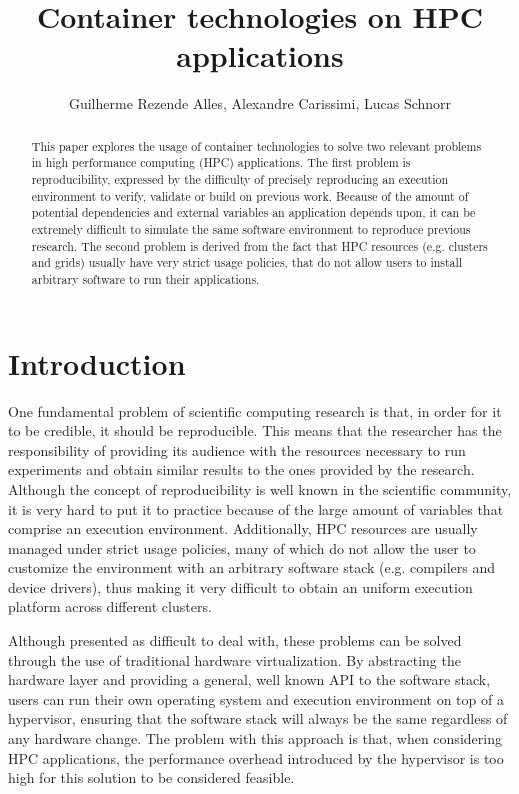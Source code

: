 \documentclass[12pt]{article}
\title{Container technologies on HPC applications}
\author{Guilherme Rezende Alles\inst{1}, Alexandre Carissimi\inst{1}, Lucas Schnorr\inst{1}}
\begin{document}
 

\maketitle

\begin{abstract}
  This paper explores the usage of container technologies to solve two relevant problems in high performance computing (HPC) applications. The first problem is reproducibility, expressed by the difficulty of precisely reproducing an execution environment to verify, validate or build on previous work. Because of the amount of potential dependencies and external variables an application depends upon, it can be extremely difficult to simulate the same software environment to reproduce previous research. The second problem is derived from the fact that HPC resources (e.g. clusters and grids) usually have very strict usage policies, that do not allow users to install arbitrary software to run their applications.
\end{abstract}

\section{Introduction}
One fundamental problem of scientific computing research is that, in order for it to be credible, it should be reproducible. This means that the researcher has the responsibility of providing its audience with the resources necessary to run experiments and obtain similar results to the ones provided by the research. Although the concept of reproducibility is well known in the scientific community, it is very hard to put it to practice because of the large amount of variables that comprise an execution environment. Additionally, HPC resources are usually managed under strict usage policies, many of which do not allow the user to customize the environment with an arbitrary software stack (e.g. compilers and device drivers), thus making it very difficult to obtain an uniform execution platform across different clusters.

Although presented as difficult to deal with, these problems can be solved through the use of traditional hardware virtualization. By abstracting the hardware layer and providing a general, well known API to the software stack, users can run their own operating system and execution environment on top of a hypervisor, ensuring that the software stack will always be the same regardless of any hardware change. The problem with this approach is that, when considering HPC applications, the performance overhead introduced by the hypervisor is too high for this solution to be considered feasible.
\end{document}
